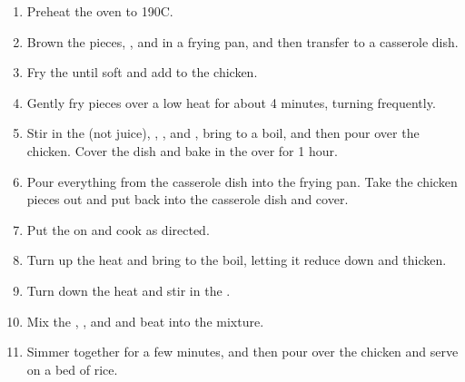 \documentclass[12pt]{article}
\begin{document}
\begin{enumerate}
    \item Preheat the oven to 190{\degrees}C.
    \item Brown the  pieces, , and  in a frying pan, and then transfer to a casserole dish.
    \item Fry the  until soft and add to the chicken.
    \item Gently fry  pieces over a low heat for about 4 minutes, turning frequently.
    \item Stir in the  (not juice), , , and , bring to a boil, and then pour over the chicken. Cover the dish and bake in the over for 1 hour.
    \item Pour everything from the casserole dish into the frying pan. Take the chicken pieces out and put back into the casserole dish and cover.
    \item Put the  on and cook as directed.
    \item Turn up the heat and bring to the boil, letting it reduce down and thicken.
    \item Turn down the heat and stir in the .
    \item Mix the , , and  and beat into the mixture.
    \item Simmer together for a few minutes, and then pour over the chicken and serve on a bed of rice.
\end{enumerate}
\end{document}
